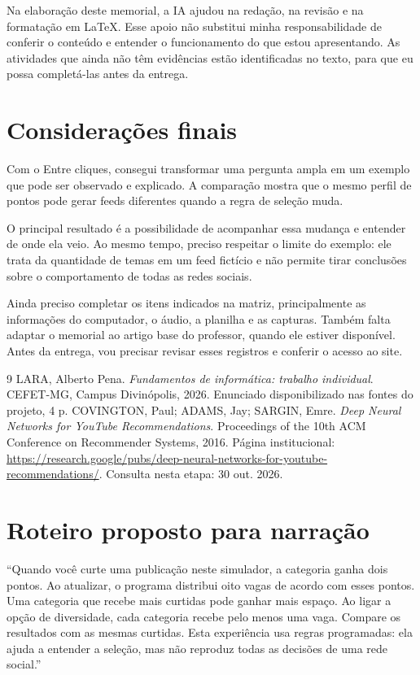 \documentclass[12pt,a4paper]{article}
\begin{document}
Na elaboração deste memorial, a IA ajudou na redação, na revisão e na formatação em LaTeX. Esse apoio não substitui minha responsabilidade de conferir o conteúdo e entender o funcionamento do que estou apresentando. As atividades que ainda não têm evidências estão identificadas no texto, para que eu possa completá-las antes da entrega.

\section{Considerações finais}
Com o Entre cliques, consegui transformar uma pergunta ampla em um exemplo que pode ser observado e explicado. A comparação mostra que o mesmo perfil de pontos pode gerar feeds diferentes quando a regra de seleção muda.

O principal resultado é a possibilidade de acompanhar essa mudança e entender de onde ela veio. Ao mesmo tempo, preciso respeitar o limite do exemplo: ele trata da quantidade de temas em um feed fictício e não permite tirar conclusões sobre o comportamento de todas as redes sociais.

Ainda preciso completar os itens indicados na matriz, principalmente as informações do computador, o áudio, a planilha e as capturas. Também falta adaptar o memorial ao artigo base do professor, quando ele estiver disponível. Antes da entrega, vou precisar revisar esses registros e conferir o acesso ao site.

\begin{thebibliography}{9}
 LARA, Alberto Pena. \textit{Fundamentos de informática: trabalho individual}. CEFET-MG, Campus Divinópolis, 2026. Enunciado disponibilizado nas fontes do projeto, 4 p.
 COVINGTON, Paul; ADAMS, Jay; SARGIN, Emre. \textit{Deep Neural Networks for YouTube Recommendations}. Proceedings of the 10th ACM Conference on Recommender Systems, 2016. Página institucional: \url{https://research.google/pubs/deep-neural-networks-for-youtube-recommendations/}. Consulta nesta etapa: 30 out. 2026.
\end{thebibliography}
\appendix
\section{Roteiro proposto para narração}\label{ap:roteiro}
``Quando você curte uma publicação neste simulador, a categoria ganha dois pontos. Ao atualizar, o programa distribui oito vagas de acordo com esses pontos. Uma categoria que recebe mais curtidas pode ganhar mais espaço. Ao ligar a opção de diversidade, cada categoria recebe pelo menos uma vaga. Compare os resultados com as mesmas curtidas. Esta experiência usa regras programadas: ela ajuda a entender a seleção, mas não reproduz todas as decisões de uma rede social.''
\end{document}
